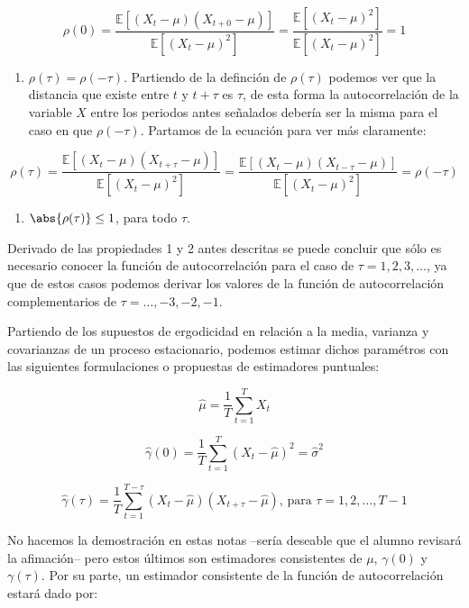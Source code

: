 \documentclass[
  a4paper,
]{article}
\providecommand{\tightlist}{%
  \setlength{\itemsep}{0pt}\setlength{\parskip}{0pt}}\usepackage{longtable,booktabs,array}
\begin{document}
\[
\rho(0) = \frac{\mathbb{E}[(X_t - \mu)(X_{t + 0} - \mu)]}{\mathbb{E}[(X_t - \mu)^2]} = \frac{\mathbb{E}[(X_t - \mu)^2]}{\mathbb{E}[(X_t - \mu)^2]} = 1
\]

\begin{enumerate}
\def\labelenumi{\arabic{enumi}.}
\tightlist
\item
  \(\rho(\tau) = \rho(-\tau)\). Partiendo de la definción de
  \(\rho(\tau)\) podemos ver que la distancia que existe entre \(t\) y
  \(t + \tau\) es \(\tau\), de esta forma la autocorrelación de la
  variable \(X\) entre los periodos antes señalados debería ser la misma
  para el caso en que \(\rho(-\tau)\). Partamos de la ecuación para ver
  más claramente:
\end{enumerate}

\[
\rho(\tau) = \frac{\mathbb{E}[(X_t - \mu)(X_{t + \tau} - \mu)]}{\mathbb{E}[(X_t - \mu)^2]} = \frac{\mathbb{E}[(X_t - \mu)(X_{t - \tau} - \mu)]}{\mathbb{E}[(X_t - \mu)^2]} = \rho(-\tau)
\]

\begin{enumerate}
\def\labelenumi{\arabic{enumi}.}
\tightlist
\item
  \(\abs{\rho(\tau)} \leq 1\), para todo \(\tau\).
\end{enumerate}

Derivado de las propiedades 1 y 2 antes descritas se puede concluir que
sólo es necesario conocer la función de autocorrelación para el caso de
\(\tau = 1, 2, 3, \ldots\), ya que de estos casos podemos derivar los
valores de la función de autocorrelación complementarios de
\(\tau = \ldots, -3, -2, -1\).

Partiendo de los supuestos de ergodicidad en relación a la media,
varianza y covarianzas de un proceso estacionario, podemos estimar
dichos paramétros con las siguientes formulaciones o propuestas de
estimadores puntuales:

\[
\hat{\mu} = \frac{1}{T} \sum^T_{t=1} X_t
\]

\[
\hat{\gamma}(0) = \frac{1}{T} \sum^T_{t=1} (X_t - \hat{\mu})^2 = \hat{\sigma}^2
\]

\[
\hat{\gamma}(\tau) = \frac{1}{T} \sum^{T - \tau}_{t=1} (X_t - \hat{\mu})(X_{t+\tau} - \hat{\mu}) \mbox{, para } \tau = 1, 2, \ldots, T-1
\]

No hacemos la demostración en estas notas --sería deseable que el alumno
revisará la afimación-- pero estos últimos son estimadores consistentes
de \(\mu\), \(\gamma(0)\) y \(\gamma(\tau)\). Por su parte, un estimador
consistente de la función de autocorrelación estará dado por:
\end{document}
